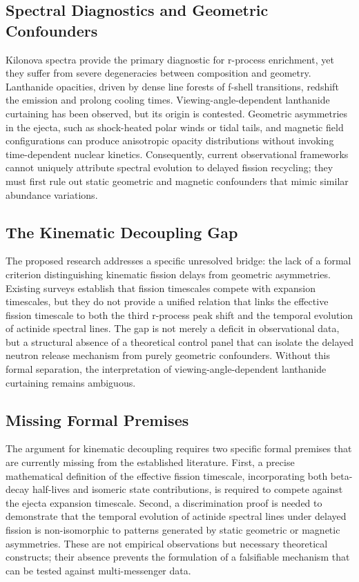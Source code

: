\documentclass[conference]{IEEEtran}
\begin{document}
\subsection{Spectral Diagnostics and Geometric Confounders}
Kilonova spectra provide the primary diagnostic for r-process enrichment, yet they suffer from severe degeneracies between composition and geometry. Lanthanide opacities, driven by dense line forests of f-shell transitions, redshift the emission and prolong cooling times. Viewing-angle-dependent lanthanide curtaining has been observed, but its origin is contested. Geometric asymmetries in the ejecta, such as shock-heated polar winds or tidal tails, and magnetic field configurations can produce anisotropic opacity distributions without invoking time-dependent nuclear kinetics. Consequently, current observational frameworks cannot uniquely attribute spectral evolution to delayed fission recycling; they must first rule out static geometric and magnetic confounders that mimic similar abundance variations.~\cite{cite_43194f3b6113c2ab}

\subsection{The Kinematic Decoupling Gap}
The proposed research addresses a specific unresolved bridge: the lack of a formal criterion distinguishing kinematic fission delays from geometric asymmetries. Existing surveys establish that fission timescales compete with expansion timescales, but they do not provide a unified relation that links the effective fission timescale to both the third r-process peak shift and the temporal evolution of actinide spectral lines. The gap is not merely a deficit in observational data, but a structural absence of a theoretical control panel that can isolate the delayed neutron release mechanism from purely geometric confounders. Without this formal separation, the interpretation of viewing-angle-dependent lanthanide curtaining remains ambiguous.

\subsection{Missing Formal Premises}
The argument for kinematic decoupling requires two specific formal premises that are currently missing from the established literature. First, a precise mathematical definition of the effective fission timescale, incorporating both beta-decay half-lives and isomeric state contributions, is required to compete against the ejecta expansion timescale. Second, a discrimination proof is needed to demonstrate that the temporal evolution of actinide spectral lines under delayed fission is non-isomorphic to patterns generated by static geometric or magnetic asymmetries. These are not empirical observations but necessary theoretical constructs; their absence prevents the formulation of a falsifiable mechanism that can be tested against multi-messenger data.
\end{document}

